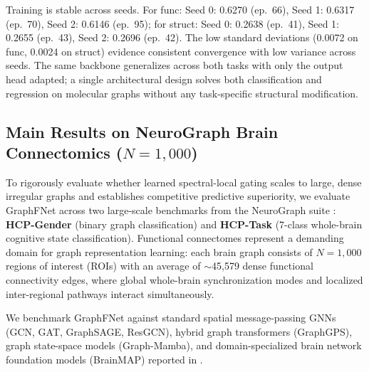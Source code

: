 \documentclass[10pt]{article}
\begin{document}
Training is stable across seeds. For func: Seed 0: 0.6270 (ep.\ 66), Seed 1: 0.6317 (ep.\ 70), Seed 2: 0.6146 (ep.\ 95); for struct: Seed 0: 0.2638 (ep.\ 41), Seed 1: 0.2655 (ep.\ 43), Seed 2: 0.2696 (ep.\ 42). The low standard deviations (0.0072 on func, 0.0024 on struct) evidence consistent convergence with low variance across seeds. The same backbone generalizes across both tasks with only the output head adapted; a single architectural design solves both classification and regression on molecular graphs without any task-specific structural modification.

\subsection{Main Results on NeuroGraph Brain Connectomics ($N=1,000$)}
\label{sec:hcp_main}

To rigorously evaluate whether learned spectral-local gating scales to large, dense irregular graphs and establishes competitive predictive superiority, we evaluate GraphFNet across two large-scale benchmarks from the NeuroGraph suite \citep{said2023neurograph}: \textbf{HCP-Gender} (binary graph classification) and \textbf{HCP-Task} (7-class whole-brain cognitive state classification). Functional connectomes represent a demanding domain for graph representation learning: each brain graph consists of $N=1,000$ regions of interest (ROIs) with an average of $\sim$45,579 dense functional connectivity edges, where global whole-brain synchronization modes and localized inter-regional pathways interact simultaneously.

We benchmark GraphFNet against standard spatial message-passing GNNs (GCN, GAT, GraphSAGE, ResGCN), hybrid graph transformers (GraphGPS), graph state-space models (Graph-Mamba), and domain-specialized brain network foundation models (BrainMAP) reported in \citet{wang2025brainmap}.
\end{document}
